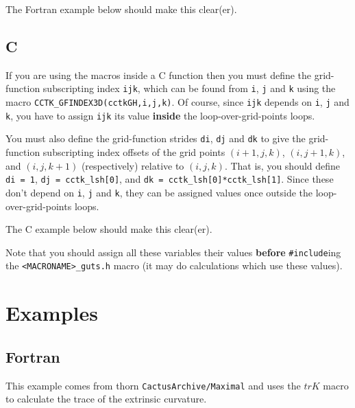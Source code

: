 The Fortran example below should make this clear(er).

\subsection{C}

If you are using the macros inside a C function then you must define
the grid-function subscripting index \texttt{ijk}, which can be found
from \texttt{i}, \texttt{j} and \texttt{k} using the macro
\texttt{CCTK\_GFINDEX3D(cctkGH,i,j,k)}.  Of course, since \texttt{ijk}
depends on \texttt{i}, \texttt{j} and \texttt{k}, you have to assign
\texttt{ijk} its value \textbf{inside} the loop-over-grid-points loops.

You must also define the grid-function strides \texttt{di}, \texttt{dj}
and \texttt{dk} to give the grid-function subscripting index offsets of
the grid points $(i+1,j,k)$, $(i,j+1,k)$, and $(i,j,k+1)$ (respectively)
relative to $(i,j,k)$.  That is, you should define \texttt{di = 1},
\texttt{dj = cctk\_lsh[0]}, and \texttt{dk = cctk\_lsh[0]*cctk\_lsh[1]}.
Since these don't depend on \texttt{i}, \texttt{j} and \texttt{k},
they can be assigned values once outside the loop-over-grid-points loops.

The C example below should make this clear(er).

Note that you should assign all these variables their values \textbf{before}
\texttt{\#include}ing the \texttt{<MACRONAME>\_guts.h} macro (it may do
calculations which use these values).


\section{Examples}

\subsection{Fortran}

This example comes from thorn \texttt{CactusArchive/Maximal} and uses
the $trK$ macro to calculate the trace of the extrinsic curvature.

